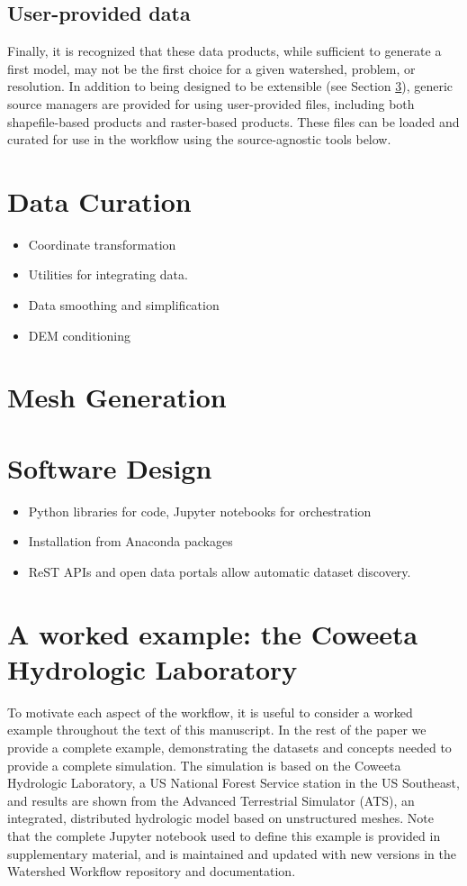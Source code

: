 \documentclass[a4paper,fleqn]{cas-dc}
\begin{document}
\subsection{User-provided data}\label{ssc:acquisition:user}
%
Finally, it is recognized that these data products, while sufficient to generate a first model, may not be the first choice for a given watershed, problem, or resolution.
In addition to being designed to be extensible (see Section \ref{sec:approach}), generic source managers are provided for using user-provided files, including both shapefile-based products and raster-based products.
These files can be loaded and curated for use in the workflow using the source-agnostic tools below.

\section{Data Curation}\label{sec:data_curation}

\begin{itemize}
\item Coordinate transformation
\item Utilities for integrating data.
\item Data smoothing and simplification
\item DEM conditioning
\end{itemize}

\section{Mesh Generation}\label{sec:meshes}

\section{Software Design}\label{sec:approach}
%
\begin{itemize}
\item Python libraries for code, Jupyter notebooks for orchestration
\item Installation from Anaconda packages
\item ReST APIs and open data portals allow automatic dataset discovery.
\end{itemize}

\section{A worked example: the Coweeta Hydrologic Laboratory}\label{sec:example}
%
To motivate each aspect of the workflow, it is useful to consider a worked example throughout the text of this manuscript.
In the rest of the paper we provide a complete example, demonstrating the datasets and concepts needed to provide a complete simulation.
The simulation is based on the Coweeta Hydrologic Laboratory, a US National Forest Service station in the US Southeast,\cite{??} and results are shown from the Advanced Terrestrial Simulator\cite{CoonWRR??} (ATS), an integrated, distributed hydrologic model based on unstructured meshes.
Note that the complete Jupyter notebook used to define this example is provided in supplementary material, and is maintained and updated with new versions in the Watershed Workflow repository and documentation.
\end{document}
